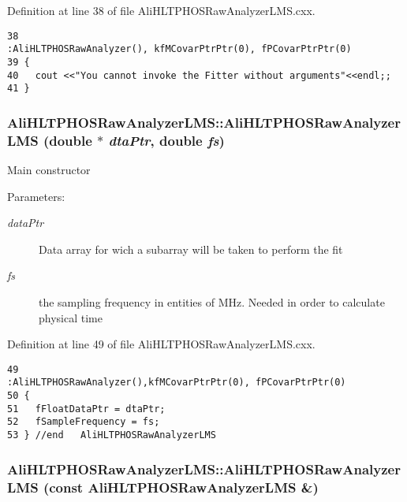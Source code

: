 Definition at line 38 of file Ali\-HLTPHOSRaw\-Analyzer\-LMS.cxx.

\footnotesize\begin{verbatim}38                                                   :AliHLTPHOSRawAnalyzer(), kfMCovarPtrPtr(0), fPCovarPtrPtr(0) 
39 {
40   cout <<"You cannot invoke the Fitter without arguments"<<endl;;
41 }
\end{verbatim}\normalsize 


\subsubsection{\setlength{\rightskip}{0pt plus 5cm}Ali\-HLTPHOSRaw\-Analyzer\-LMS::Ali\-HLTPHOSRaw\-Analyzer\-LMS (double $\ast$ {\em dta\-Ptr}, double {\em fs})}\label{classAliHLTPHOSRawAnalyzerLMS_AliHLTPHOSRawAnalyzerLMSa1}


Main constructor \begin{Desc}
\item[Parameters:]
\begin{description}
\item[{\em data\-Ptr}]Data array for wich a subarray will be taken to perform the fit \item[{\em fs}]the sampling frequency in entities of MHz. Needed in order to calculate physical time \end{description}
\end{Desc}


Definition at line 49 of file Ali\-HLTPHOSRaw\-Analyzer\-LMS.cxx.

\footnotesize\begin{verbatim}49                                                                            :AliHLTPHOSRawAnalyzer(),kfMCovarPtrPtr(0), fPCovarPtrPtr(0) 
50 {
51   fFloatDataPtr = dtaPtr;  
52   fSampleFrequency = fs;
53 } //end   AliHLTPHOSRawAnalyzerLMS 
\end{verbatim}\normalsize 


\subsubsection{\setlength{\rightskip}{0pt plus 5cm}Ali\-HLTPHOSRaw\-Analyzer\-LMS::Ali\-HLTPHOSRaw\-Analyzer\-LMS (const {\bf Ali\-HLTPHOSRaw\-Analyzer\-LMS} \&)}\label{classAliHLTPHOSRawAnalyzerLMS_AliHLTPHOSRawAnalyzerLMSa2}


